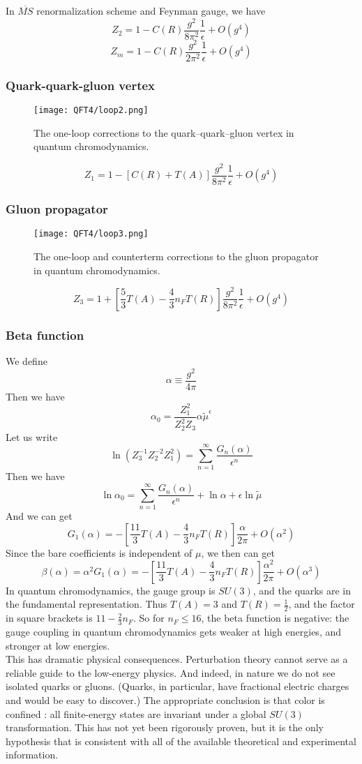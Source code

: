 \noindent
In $\overline{MS}$ renormalization scheme and Feynman gauge, we have
\[Z_2 = 1 - C(R)\frac{g^2}{8\pi^2}\frac{1}{\epsilon} + O(g^4)\]
\[Z_m = 1 - C(R)\frac{g^2}{2\pi^2}\frac{1}{\epsilon} + O(g^4)\]

\subsubsection{Quark-quark-gluon vertex}
\begin{figure}[!h]
	\centering
	\texttt{[image: QFT4/loop2.png]}
	\caption{The one-loop corrections to the quark–quark–gluon vertex in quantum chromodynamics.}
\end{figure}
\[Z_1 = 1 - [C(R) + T(A)]\frac{g^2}{8\pi^2}\frac{1}{\epsilon} + O(g^4)\]

\subsubsection{Gluon propagator}
\begin{figure}[!h]
	\centering
	\texttt{[image: QFT4/loop3.png]}
	\caption{The one-loop and counterterm corrections to the gluon propagator in quantum chromodynamics.}
\end{figure}
\[Z_3 = 1 + \left[\frac{5}{3}T(A) - \frac{4}{3}n_F T(R)\right]\frac{g^2}{8\pi^2}\frac{1}{\epsilon} + O(g^4)\]

\subsubsection{Beta function}
We define
\[\alpha \equiv \frac{g^2}{4\pi}\]
Then we have
\[\alpha_0 = \frac{Z_1^2}{Z_2^2 Z_3} \alpha \tilde{\mu}^{\epsilon}\]
Let us write
\[\ln \left( Z_3^{-1}Z_2^{-2}Z_1^2 \right) = \sum_{n=1}^{\infty} \frac{G_n(\alpha)}{\epsilon^n}\]
Then we have
\[\ln \alpha_0 = \sum_{n=1}^{\infty} \frac{G_n(\alpha)}{\epsilon^n} + \ln \alpha + \epsilon \ln \tilde{\mu}\]
And we can get
\[G_1(\alpha) = - \left[ \frac{11}{3}T(A) - \frac{4}{3} n_F T(R) \right] \frac{\alpha}{2\pi} + O(\alpha^2)\]
Since the bare coefficients is independent of $\mu$, we then can get
\[\beta(\alpha) = \alpha^2 G_1(\alpha) = - \left[ \frac{11}{3}T(A) - \frac{4}{3} n_F T(R) \right] \frac{\alpha^2}{2\pi} + O(\alpha^3)\]
In quantum chromodynamics, the gauge group is $SU(3)$, and the quarks are in the fundamental representation. Thus $T(A) = 3$ and $T(R) = \frac{1}{2}$, and the factor in square brackets is $11 - \frac{2}{3} n_F$. So for $n_F \leq 16$, the beta function is negative: the gauge coupling in quantum chromodynamics gets weaker at high energies, and stronger at low energies.\\
This has dramatic physical consequences. Perturbation theory cannot serve as a reliable guide to the low-energy physics. And indeed, in nature we do not see isolated quarks or gluons. (Quarks, in particular, have fractional electric charges and would be easy to discover.) The appropriate conclusion is that color is confined : all finite-energy states are invariant under a global $SU(3)$ transformation. This has not yet been rigorously proven, but it is the
only hypothesis that is consistent with all of the available theoretical and experimental information.

